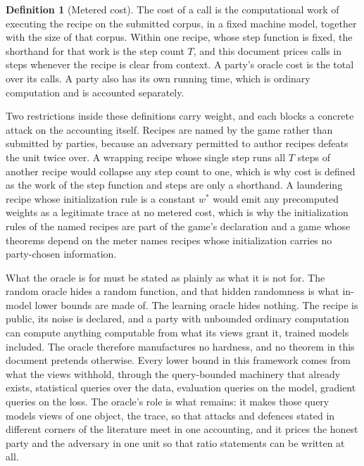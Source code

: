\documentclass[11pt]{article}
\theoremstyle{definition}
\newtheorem{definition}{Definition}
\theoremstyle{plain}
\theoremstyle{remark}
\begin{document}
\begin{definition}[Metered cost]
\label{def:cost}
The cost of a call is the computational work of executing the recipe on the
submitted corpus, in a fixed machine model, together with the size of that
corpus. Within one recipe, whose step function is fixed, the shorthand for that
work is the step count $T$, and this document prices calls in steps whenever the
recipe is clear from context. A party's oracle cost is the total over its calls.
A party also has its own running time, which is ordinary computation and is
accounted separately.
\end{definition}

Two restrictions inside these definitions carry weight, and each blocks a
concrete attack on the accounting itself. Recipes are named by the game rather
than submitted by parties, because an adversary permitted to author recipes
defeats the unit twice over. A wrapping recipe whose single step runs all $T$
steps of another recipe would collapse any step count to one, which is why cost
is defined as the work of the step function and steps are only a shorthand. A
laundering recipe whose initialization rule is a constant $w^*$ would emit any
precomputed weights as a legitimate trace at no metered cost, which is why the
initialization rules of the named recipes are part of the game's declaration and
a game whose theorems depend on the meter names recipes whose initialization
carries no party-chosen information.

What the oracle is for must be stated as plainly as what it is not for. The
random oracle hides a random function, and that hidden randomness is what
in-model lower bounds are made of. The learning oracle hides nothing. The recipe
is public, its noise is declared, and a party with unbounded ordinary
computation can compute anything computable from what its views grant it,
trained models included. The oracle therefore manufactures no hardness, and no
theorem in this document pretends otherwise. Every lower bound in this framework
comes from what the views withhold, through the query-bounded machinery that
already exists, statistical queries over the data, evaluation queries on the
model, gradient queries on the loss. The oracle's role is what remains: it makes
those query models views of one object, the trace, so that attacks and defences
stated in different corners of the literature meet in one accounting, and it
prices the honest party and the adversary in one unit so that ratio statements
can be written at all.
\end{document}
